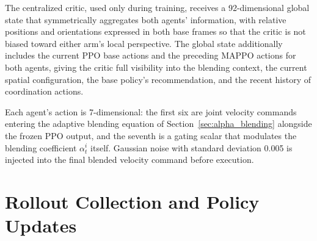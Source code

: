 The centralized critic, used only during training, receives a 92-dimensional global state that
symmetrically aggregates both agents' information, with relative positions and orientations
expressed in both base frames so that the critic is not biased toward either arm's local
perspective. The global state additionally includes the current PPO base actions and the preceding
MAPPO actions for both agents, giving the critic full visibility into the blending context, the
current spatial configuration, the base policy's recommendation, and the recent history of
coordination actions.

Each agent's action is 7-dimensional: the first six are joint velocity commands entering the
adaptive blending equation of Section~\ref{sec:alpha_blending} alongside the frozen PPO output, and
the seventh is a gating scalar that modulates the blending coefficient $\alpha_t^i$ itself. Gaussian
noise with standard deviation 0.005 is injected into the final blended velocity command before
execution.

\section{Rollout Collection and Policy Updates}\label{sec:alpha_rollout}

